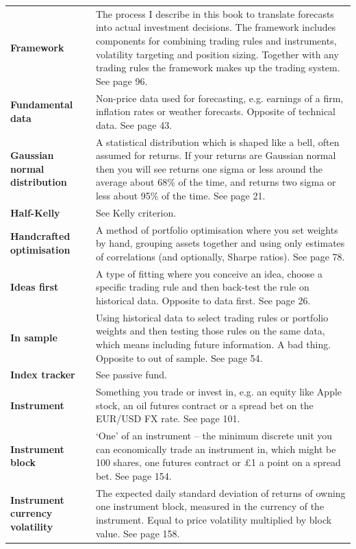 {\begin{longtable}{@{}>{\raggedright\arraybackslash\bfseries} p{}>{\raggedright\arraybackslash} p{}@{}}
Framework & The process I describe in this book to translate forecasts into actual investment decisions. The framework includes components for combining trading rules and instruments, volatility targeting and position sizing. Together with any trading rules the framework makes up the trading system. See page 96. \\[0.65em]
Fundamental data & Non-price data used for forecasting, e.g. earnings of a firm, inflation rates or weather forecasts. Opposite of technical data. See page 43. \\[0.65em]
Gaussian normal distribution & A statistical distribution which is shaped like a bell, often assumed for returns. If your returns are Gaussian normal then you will see returns one sigma or less around the average about 68\% of the time, and returns two sigma or less about 95\% of the time. See page 21. \\[0.65em]
Half-Kelly & See Kelly criterion. \\[0.65em]
Handcrafted optimisation & A method of portfolio optimisation where you set weights by hand, grouping assets together and using only estimates of correlations (and optionally, Sharpe ratios). See page 78. \\[0.65em]
Ideas first & A type of fitting where you conceive an idea, choose a specific trading rule and then back-test the rule on historical data. Opposite to data first. See page 26. \\[0.65em]
In sample & Using historical data to select trading rules or portfolio weights and then testing those rules on the same data, which means including future information. A bad thing. Opposite to out of sample. See page 54. \\[0.65em]
Index tracker & See passive fund. \\[0.65em]
Instrument & Something you trade or invest in, e.g. an equity like Apple stock, an oil futures contract or a spread bet on the EUR/USD FX rate. See page 101. \\[0.65em]
Instrument block & ‘One’ of an instrument – the minimum discrete unit you can economically trade an instrument in, which might be 100 shares, one futures contract or £1 a point on a spread bet. See page 154. \\[0.65em]
Instrument currency volatility & The expected daily standard deviation of returns of owning one instrument block, measured in the currency of the instrument. Equal to price volatility multiplied by block value. See page 158. \\[0.65em]

\end{longtable}}
